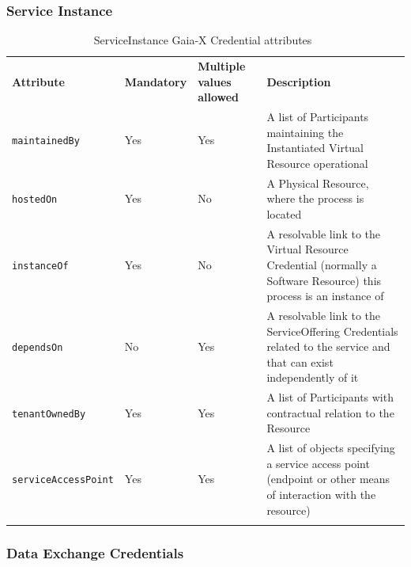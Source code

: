 \subsubsection{Service Instance}

\begin{longtable}{ |p{4cm}|p{2cm}|p{2cm}|p{7cm}| }
    \hhline{----}
    \textbf{Attribute} & \textbf{Mandatory} & \textbf{Multiple values allowed} & \textbf{Description}\\
    \hhline{----}
    \texttt{maintainedBy} & Yes & Yes & A list of Participants maintaining the Instantiated Virtual Resource operational\\
    \hhline{----}
    \texttt{hostedOn} & Yes & No & A Physical Resource, where the process is located\\
    \hhline{----}
    \texttt{instanceOf} & Yes & No & A resolvable link to the Virtual Resource Credential (normally a Software Resource) this process is an instance of\\
    \hhline{----}
    \texttt{dependsOn} & No & Yes & A resolvable link to the ServiceOffering Credentials related to the service and that can exist independently of it\\
    \hhline{----}
    \texttt{tenantOwnedBy} & Yes & Yes & A list of Participants with contractual relation to the Resource\\
    \hhline{----}
    \texttt{serviceAccessPoint} & Yes & Yes & A list of objects specifying a service access point (endpoint or other means of interaction with the resource)\\
    \hhline{----}
    \caption{ServiceInstance Gaia-X Credential attributes~\cite{gaiax_trust_framework}}
    \label{tab:service_instance}
\end{longtable}

\subsubsection{Data Exchange Credentials}

